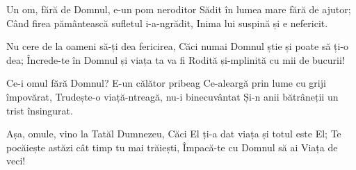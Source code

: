 \beginverse
Un om, fără de Domnul, e-un pom neroditor
Sădit în lumea mare fără de ajutor;
Când firea pământească sufletul i-a-ngrădit,
Inima lui suspină și e nefericit.
\endverse

\beginchorus
Nu cere de la oameni să-ți dea fericirea,
Căci numai Domnul știe și poate să ți-o dea;
Încrede-te în Domnul și viața ta va fi
Rodită și-mplinită cu mii de bucurii!
\endchorus

\beginverse
Ce-i omul fără Domnul? E-un călător pribeag
Ce-aleargă prin lume cu griji împovărat,
Trudește-o viață-ntreagă, nu-i binecuvântat
Și-n anii bătrâneții un trist însingurat.
\endverse

\beginverse
Așa, omule, vino la Tatăl Dumnezeu,
Căci El ți-a dat viața și totul este El;
Te pocăiește astăzi cât timp tu mai trăiești,
Împacă-te cu Domnul să ai Viața de veci!
\endverse
\endsong